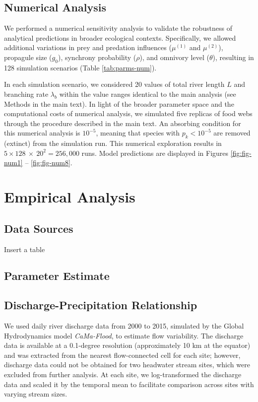 \documentclass[11pt, class=article, crop=false]{standalone}
\theoremstyle{definition}
\begin{document}
\newpage

\subsection{Numerical Analysis}

We performed a numerical sensitivity analysis to validate the robustness of analytical predictions in broader ecological contexts.
Specifically, we allowed additional variations in prey and predation influences ($\mu^{(1)}$ and $\mu^{(2)}$), propagule size ($g_0$), synchrony probability ($\rho$), and omnivory level ($\theta$), resulting in 128 simulation scenarios (Table \ref{tab:parms-num}).

In each simulation scenario, we considered 20 values of total river length $L$ and branching rate $\lambda_b$ within the value ranges identical to the main analysis (see Methods in the main text).
In light of the broader parameter space and the computational costs of numerical analysis, we simulated five replicas of food webs through the procedure described in the main text.
An absorbing condition for this numerical analysis is $10^{-5}$, meaning that species with $p_k < 10^{-5}$ are removed (extinct) from the simulation run.
This numerical exploration results in $5 \times 128~\times~20^2 = 256,000$ runs.
Model predictions are displayed in Figures \ref{fig:fig-num1} -- \ref{fig:fig-num8}.



\newpage



\section{Empirical Analysis}

\subsection{Data Sources}

Insert a table

\subsection{Parameter Estimate}



\subsection{Discharge-Precipitation Relationship}
We used daily river discharge data from 2000 to 2015, simulated by the Global Hydrodynamics model \textit{CaMa-Flood}, to estimate flow variability.
The discharge data is available at a 0.1-degree resolution (approximately 10 km at the equator) and was extracted from the nearest flow-connected cell for each site; however, discharge data could not be obtained for two headwater stream sites, which were excluded from further analysis.
At each site, we log-transformed the discharge data and scaled it by the temporal mean to facilitate comparison across sites with varying stream sizes.
\end{document}
